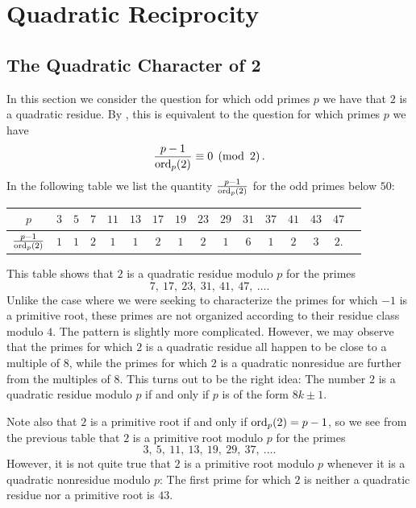 \chapter{Quadratic Reciprocity}\label{chapter:quadratic-reciprocity}

\section{The Quadratic Character of 2}

In this section we consider the question for which odd primes $p$ we have that $2$ is a quadratic residue. By , this is equivalent to the question for which primes $p$ we have
\begin{equation*}
  \frac{p-1}{\operatorname{ord}_p(2)}\equiv 0\mkern5mu\left(\operatorname{mod} \mkern 6mu 2\right).
\end{equation*}
In the following table we list the quantity $\frac{p-1}{\operatorname{ord}_p(2)}$ for the odd primes below $50$:
\begin{center}
  \begin{tabular}{c|ccccccccccccccc}
    $p$ & $3$ & $5$ & $7$ & $11$ & $13$ & $17$ & $19$ & $23$ & $29$ & $31$ & $37$ & $41$ & $43$ & $47$ \\ \midrule
    $\frac{p-1}{\operatorname{ord}_p(2)}$ & $1$ & $1$ & $2$ & $1$ & $1$ & $2$ & $1$ & $2$ & $1$ & $6$ & $1$ & $2$ & $3$ & $2$. \\
  \end{tabular}
\end{center}
This table shows that $2$ is a quadratic residue modulo $p$ for the primes
\begin{equation*}
  7,~17,~23,~31,~41,~47,~\ldots.
\end{equation*}
Unlike the case where we were seeking to characterize the primes for which $-1$ is a primitive root, these primes are not organized according to their residue class modulo $4$. The pattern is slightly more complicated. However, we may observe that the primes for which $2$ is a quadratic residue all happen to be close to a multiple of $8$, while the primes for which $2$ is a quadratic nonresidue are further from the multiples of $8$. This turns out to be the right idea: The number $2$ is a quadratic residue modulo $p$ if and only if $p$ is of the form $8k\pm 1$.

Note also that $2$ is a primitive root if and only if $\operatorname{ord}_p(2) = p-1$, so we see from the previous table that $2$ is a primitive root modulo $p$ for the primes
\begin{equation*}
  3,~5,~11,~13,~19,~29,~37,~\ldots.
\end{equation*}
However, it is not quite true that $2$ is a primitive root modulo $p$ whenever it is a quadratic nonresidue modulo $p$: The first prime for which $2$ is neither a quadratic residue nor a primitive root is $43$.


